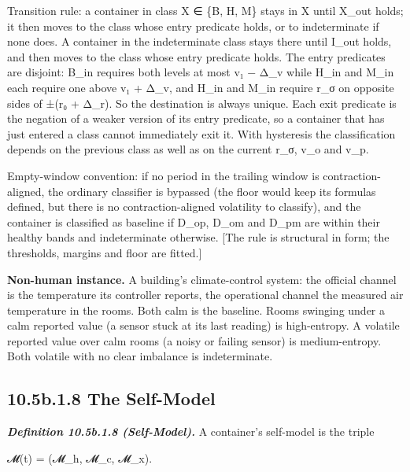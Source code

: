 \documentclass[
]{article}
\begin{document}
Transition rule: a container in class X ∈ \{B, H, M\} stays in X until
X\_out holds; it then moves to the class whose entry predicate holds, or
to indeterminate if none does. A container in the indeterminate class
stays there until I\_out holds, and then moves to the class whose entry
predicate holds. The entry predicates are disjoint: B\_in requires both
levels at most v₁ − Δ\_v while H\_in and M\_in each require one above v₁
+ Δ\_v, and H\_in and M\_in require r\_σ on opposite sides of ±(r₀ +
Δ\_r). So the destination is always unique. Each exit predicate is the
negation of a weaker version of its entry predicate, so a container that
has just entered a class cannot immediately exit it. With hysteresis the
classification depends on the previous class as well as on the current
r\_σ, v\_o and v\_p.

Empty-window convention: if no period in the trailing window is
contraction-aligned, the ordinary classifier is bypassed (the floor
would keep its formulas defined, but there is no contraction-aligned
volatility to classify), and the container is classified as baseline if
D\_op, D\_om and D\_pm are within their healthy bands and indeterminate
otherwise. {[}The rule is structural in form; the thresholds, margins
and floor are fitted.{]}

\textbf{Non-human instance.} A building's climate-control system: the
official channel is the temperature its controller reports, the
operational channel the measured air temperature in the rooms. Both calm
is the baseline. Rooms swinging under a calm reported value (a sensor
stuck at its last reading) is high-entropy. A volatile reported value
over calm rooms (a noisy or failing sensor) is medium-entropy. Both
volatile with no clear imbalance is indeterminate.

\hypertarget{b.1.8-the-self-model}{%
\subsection{10.5b.1.8 The Self-Model}\label{b.1.8-the-self-model}}

\emph{\textbf{Definition 10.5b.1.8 (Self-Model).}} A container's
self-model is the triple

𝓜(t) = (𝓜\_h, 𝓜\_c, 𝓜\_x).
\end{document}

